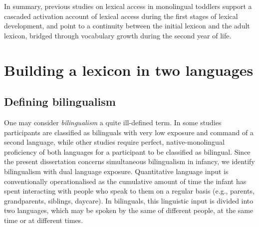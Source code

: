 \documentclass[
  12pt,
  b5paperpaper,
  twoside]{scrreprt}
\begin{document}
In summary, previous studies on lexical access in monolingual toddlers
support a cascaded activation account of lexical access during the first
stages of lexical development, and point to a continuity between the
initial lexicon and the adult lexicon, bridged through vocabulary growth
during the second year of life.

\hypertarget{building-a-lexicon-in-two-languages}{%
\section{Building a lexicon in two
languages}\label{building-a-lexicon-in-two-languages}}

\hypertarget{defining-bilingualism}{%
\subsection{Defining bilingualism}\label{defining-bilingualism}}

One may consider \emph{bilingualism} a quite ill-defined term. In some
studies participants are classified as bilinguals with very low exposure
and command of a second language, while other studies require perfect,
native-monolingual proficiency of both languages for a participant to be
classified as bilingual. Since the present dissertation concerns
simultaneous bilingualism in infancy, we identify bilingualism with dual
language exposure. Quantitative language input is conventionally
operationalised as the cumulative amount of time the infant has spent
interacting with people who speak to them on a regular basis (e.g.,
parents, grandparents, siblings, daycare). In bilinguals, this
linguistic input is divided into two languages, which may be spoken by
the same of different people, at the same time or at different times.
\end{document}

